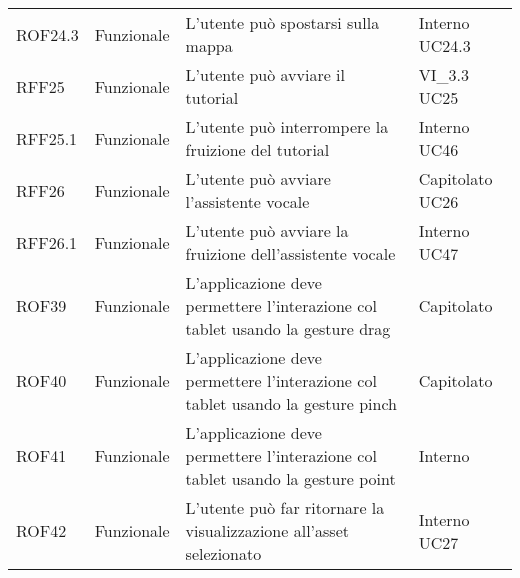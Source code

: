 \begin{longtable}{p{2cm}!{\VRule[1pt]}p{2cm}!{\VRule[1pt]}p{5cm}!{\VRule[1pt]}p{1.5cm}}
	\\
	ROF24.3                          & Funzionale\newline               & L'utente può spostarsi sulla mappa                                                                                       & Interno \newline UC24.3      
	\\
	RFF25                            & Funzionale\newline               & L'utente può avviare il tutorial                                                                                         & VI_3.3 \newline UC25         
	\\
	RFF25.1&Funzionale\newline  & L'utente può interrompere la fruizione del tutorial & Interno \newline UC46
	\\
	RFF26                            & Funzionale\newline               & L'utente può avviare l'assistente vocale                                                                                 & Capitolato \newline UC26     
	\\
	RFF26.1&Funzionale\newline  & L'utente può avviare la fruizione dell'assistente vocale & Interno \newline UC47
	\\
	ROF39                            & Funzionale\newline               & L'applicazione deve permettere l'interazione col tablet usando la gesture drag                                            & Capitolato                   \\
		ROF40                            & Funzionale\newline               & L'applicazione deve permettere l'interazione col tablet usando la gesture pinch                                           & Capitolato                   \\
	ROF41                            & Funzionale\newline               & L'applicazione deve permettere l'interazione col tablet usando la gesture point                                           & Interno                      \\
	ROF42                            & Funzionale\newline               & L'utente può far ritornare la visualizzazione all'asset selezionato                                                      & Interno \newline UC27        

\end{longtable}
